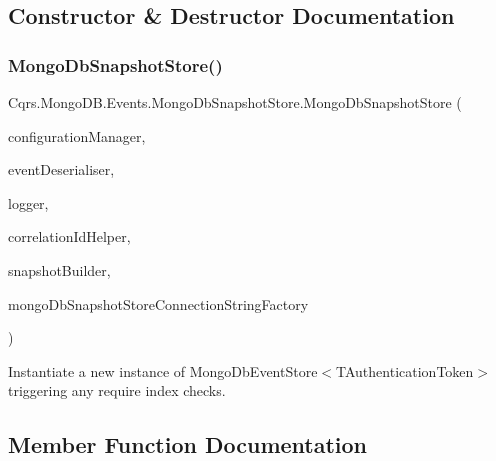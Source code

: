 \subsection{Constructor \& Destructor Documentation}
\mbox{\label{classCqrs_1_1MongoDB_1_1Events_1_1MongoDbSnapshotStore_a44bcb1f797f9c20ae2214f3488addd27_a44bcb1f797f9c20ae2214f3488addd27}} 
\subsubsection{\texorpdfstring{Mongo\+Db\+Snapshot\+Store()}{MongoDbSnapshotStore()}}
{\footnotesize\ttfamily Cqrs.\+Mongo\+D\+B.\+Events.\+Mongo\+Db\+Snapshot\+Store.\+Mongo\+Db\+Snapshot\+Store (\begin{DoxyParamCaption}\item[{\hyperlink{interfaceCqrs_1_1Configuration_1_1IConfigurationManager}{I\+Configuration\+Manager}}]{configuration\+Manager,  }\item[{\hyperlink{interfaceCqrs_1_1Events_1_1ISnapshotDeserialiser}{I\+Snapshot\+Deserialiser}}]{event\+Deserialiser,  }\item[{I\+Logger}]{logger,  }\item[{I\+Correlation\+Id\+Helper}]{correlation\+Id\+Helper,  }\item[{\hyperlink{interfaceCqrs_1_1Events_1_1ISnapshotBuilder}{I\+Snapshot\+Builder}}]{snapshot\+Builder,  }\item[{\hyperlink{interfaceCqrs_1_1MongoDB_1_1Events_1_1IMongoDbSnapshotStoreConnectionStringFactory}{I\+Mongo\+Db\+Snapshot\+Store\+Connection\+String\+Factory}}]{mongo\+Db\+Snapshot\+Store\+Connection\+String\+Factory }\end{DoxyParamCaption})}



Instantiate a new instance of Mongo\+Db\+Event\+Store$<$\+T\+Authentication\+Token$>$ triggering any require index checks. 



\subsection{Member Function Documentation}
\mbox{\label{classCqrs_1_1MongoDB_1_1Events_1_1MongoDbSnapshotStore_acb01680aad8c2671206bc851da17a036_acb01680aad8c2671206bc851da17a036}} 
